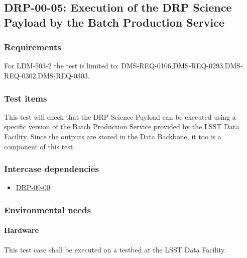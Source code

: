 \subsection{DRP-00-05: Execution of the DRP Science Payload by the Batch Production Service}
\label{drp-00-05}

\subsubsection{Requirements}

For LDM-503-2 the test is limited to: DMS-REQ-0106,DMS-REQ-0293,DMS-REQ-0302,DMS-REQ-0303.

\subsubsection{Test items}

This test will check that the DRP Science Payload can be executed
using a specific version of the Batch Production Service provided
by the LSST Data Facility.  Since the outputs are stored in the
Data Backbone, it too is a component of this test.

\subsubsection{Intercase dependencies}

\begin{itemize}

  \item{\hyperref[drp-00-00]{DRP-00-00}}

\end{itemize}

\subsubsection{Environmental needs}


\paragraph{Hardware}\label{sec:hardware}

This test case shall be executed on a testbed at the LSST Data Facility.

